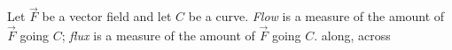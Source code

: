 {Let $\vec F$ be a vector field and let $C$ be a curve. \textit{Flow} is a measure of the amount of $\vec F$ going \underline{\hskip1in} $C$; \textit{flux} is a measure of the amount of $\vec F$ going \underline{\hskip1in} $C$.
}
{along, across
}
